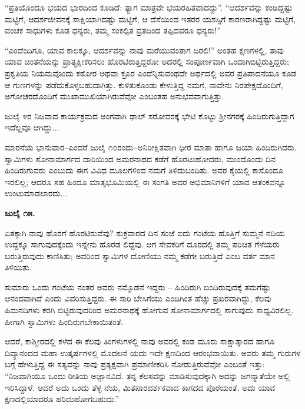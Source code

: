 “ಪ್ರತಿಯೊಂದೂ ಭಯದ ಭಾರದಿಂದ ಕೂಡಿದೆ: ತ್ಯಾಗ ಮಾತ್ರವೇ ಭಯರಹಿತವಾದದ್ದು”. “ಆದರ್ಶವನ್ನು ಕಂಡಿದ್ದಷ್ಟು ಮಟ್ಟಿಗೆ, ಆದರ್ಶಜೀವನಕ್ಕೆ ಸಾಕ್ಷಿಯಾಗಿದಷ್ಟು ಮಟ್ಟಿಗೆ, ಆ ದೆಸೆಯಿಂದ ಇತರರ ಯಶಸ್ಸಿಗೆ ಕಾರಣರಾಗಿದ್ದಷ್ಟು ಮಟ್ಟಿಗೆ, ವಂಚಕ ಸಾಧುಗಳು ಕೂಡ ಧನ್ಯರು, ತಮ್ಮ ಸಂಕಲ್ಪಿತ ವ್ರತದಿಂದ ತಪ್ಪಿದವರೂ ಧನ್ಯರು!”

“ಎಂದೆಂದಿಗೂ, ಯಾವ ಕಾಲಕ್ಕೂ, ಆದರ್ಶವನ್ನು ನಾವು ಮರೆಯುವಂತಾಗ ದಿರಲಿ!” ಅಂತಹ ಕ್ಷಣಗಳಲ್ಲಿ, ತಾವು ಯಾವ ಚಿಂತನೆಯನ್ನು ಪ್ರಾತ್ಯಕ್ಷೀಕರಿಸಲು ಹೊರಟಿರುತ್ತಿದ್ದರೋ ಅದರಲ್ಲಿ ಸಂಪೂರ್ಣವಾಗಿ ಒಂದಾಗಿಬಿಟ್ಟಿರುತ್ತಿದ್ದರು; ಪ್ರಕೃತಿಯ ನಿಯಮವೊಂದು ಕಠೋರ ಅಥವಾ ಕ್ರೂರ ಎಂದೆನ್ನಿಸುವಂಥದೇ ಅರ್ಥದಲ್ಲಿ ಅವರ ಪ್ರತಿಪಾದನೆಯೂ ಕೂಡ ಆ ಗುಣಗಳನ್ನು ಪಡೆದುಕೊಳ್ಳಬಹುದಾಗಿತ್ತು. ಕುಳಿತುಕೊಂಡು ಕೇಳುತ್ತಿದ್ದ ನಮಗೆ, ನಾವೇನು ನಿರಪೇಕ್ಷದೊಂದಿಗೆ, ಅಗೋಚರದೊಂದಿಗೆ ಮುಖಾಮುಖಿಯಾಗಿರುವೆವೋ ಎಂಬಂತಹ ಅನುಭವವಾಗುತ್ತಿತ್ತು.

ಜುಲೈ ೪ರ ನಿಜವಾದ ಕಾರ್ಯಕ್ರಮದ ಅಂಗವಾಗಿ ಢಾಲ್ ಸರೋವರಕ್ಕೆ ಭೇಟಿ ಕೊಟ್ಟು ಶ‍್ರೀನಗರಕ್ಕೆ ಹಿಂದಿರುಗುತ್ತಿದ್ದಾಗ ಇದೆಲ್ಲವೂ ಆಗಿದ್ದು...

ಮಾರನೆಯ ಭಾನುವಾರ–ಎಂದರೆ ಜುಲೈ ೧೦ರಂದು–ಅನಿರೀಕ್ಷಿತವಾಗಿ ಧೀರ ಮಾತಾ ಹಾಗೂ ಜಯಾ ಹಿಂದಿರುಗಿದರು. ಸ್ವಾಮಿಗಳು ಸೋನಾಮಾರ್ಗದ ದಾರಿಯಿಂದ ಅಮರನಾಥದ ಕಡೆಗೆ ಹೊರಟುಹೋದರು, ಮುಂದೊಂದು ದಿನ ಹಿಂದಿರುಗುವರು ಎಂಬುದು ಈಗ ವಿವಿಧ ಮೂಲಗಳಿಂದ ನಮಗೆ ತಿಳಿದುಬಂದಿತು. ಅವರ ಕೈಯಲ್ಲಿ ಕಾಸೊಂದೂ ಇರಲಿಲ್ಲ; ಆದರೂ ಸಹ ಹಿಂದೂ ಮಾತೃಭೂಮಿಯಲ್ಲಿ ಈ ಸಂಗತಿ ಅವರ ಅಭಿಮಾನಿಗಳಿಗೆ ಯಾವ ಆತಂಕವನ್ನೂ ಉಂಟುಮಾಡಲಾರದು...

\textbf{ಜುಲೈ ೧೫.}

ಏತಕ್ಕಾಗಿ ನಾವು ಹೊರಗೆ ಹೊರಟಿರುವೆವು? ಶುಕ್ರವಾರದ ದಿನ ಸಂಜೆ ಐದು ಗಂಟೆಯ ಹೊತ್ತಿಗೆ ಸುಮ್ಮನೆ ನದಿಯ ಉದ್ದಕ್ಕೂ ಸಾಗುವುದಕ್ಕೆಂದು ಇನ್ನೇನು ಹೊರಡ ಲಿದ್ದೆವು. ಆಗ ಸೇವಕರಿಗೆ ದೂರದಲ್ಲಿ ತಮ್ಮ ಪರಿಚಿತ ಗೆಳೆಯರು ಬರುತ್ತಿರುವುದು ಕಾಣಿಸಿತು; ಅವರಿಂದ ಸ್ವಾಮಿಗಳ ದೋಣಿಯು ನಮ್ಮ ಕಡೆಗೇ ಬರುತ್ತಿದೆ ಎಂಬ ವರ್ತ ಮಾನ ತಿಳಿಯಿತು.

ಸುಮಾರು ಒಂದು ಗಂಟೆಯ ನಂತರ ಅವರು ನಮ್ಮೊಡನೆ ಇದ್ದರು – ಹಿಂದಿರುಗಿ ಬಂದಿರುವುದಕ್ಕೆ ತಮಗೆಷ್ಟು ಆನಂದವಾಗಿದೆ ಎಂದು ವಿವರಿಸುತ್ತಿದ್ದರು. ಈ ಸಾರಿ ಬೇಸಿಗೆಯು ಎಂದಿಗಿಂತ ಹೆಚ್ಚು ಪ್ರಖರವಾಗಿದ್ದು, ಕೆಲವು ಹಿಮನದಿಗಳು ಕರಗಿ ಬಿಟ್ಟಿರುವುದರಿಂದ ಅಮರನಾಥಕ್ಕೆ ಹೋಗುವ ಸೋನಾಮಾರ್ಗದಲ್ಲಿ ಸಾಗುವುದು ಸಾಧ್ಯವಿರಲಿಲ್ಲ. ಹೀಗಾಗಿ ಸ್ವಾಮಿಗಳು ಹಿಂದಿರುಗಬೇಕಾಯಿತಂತೆ.

ಆದರೆ, ಕಾಶ್ಮೀರದಲ್ಲಿ ಕಳೆದ ಈ ಕೆಲವು ತಿಂಗಳುಗಳಲ್ಲಿ ನಾವು ಅವರಲ್ಲಿ ಕಂಡ ಮೂರು ಸಾಕ್ಷಾತ್ಕಾರದ ಹಾಗೂ ದಿವ್ಯಾನಂದದ ಮಹಾ ಉತ್ಕರ್ಷಗಳಲ್ಲಿ ಮೊದಲನೆ ಯದು ಇದೇ ಕ್ಷಣದಿಂದ ಆರಂಭವಾಯಿತು. ಅವರು ತಮ್ಮ ಗುರುಗಳ ಬಗ್ಗೆ ಹೇಳುತ್ತಿದ್ದ ಈ ಸತ್ಯವನ್ನು ನಾವು ಪ್ರತ್ಯಕ್ಷವಾಗಿ ಪ್ರಮಾಣೀಕರಿಸಿ ನೋಡುತ್ತಿರುವೆವೋ ಎಂಬಂತೆ ಇತ್ತು: “ನಿಜವಾಗಿಯೂ ಒಂದು ರೀತಿಯ ಅಜ್ಞಾನವಿದೆ. ತನ್ನ ಕೆಲಸವನ್ನು ಮಾಡಿಸುವುದಕ್ಕಾಗಿ ಅದನ್ನು ಜಗನ್ಮಾತೆಯೇ ಅಲ್ಲಿ ಇರಿಸಿದ್ದಾಳೆ. ಆದರೆ ಅದು ಒಂದು ತೆಳ್ಳ ನೆಯ, ಮಿತಪಾರದರ್ಶಕವಾದ ಕಾಗದದ ಪೊರೆಯಂತೆ. ಅದು ಯಾವ ಕ್ಷಣದಲ್ಲಿಯಾದರೂ ಹರಿದುಹೋಗಬಹುದು.”

